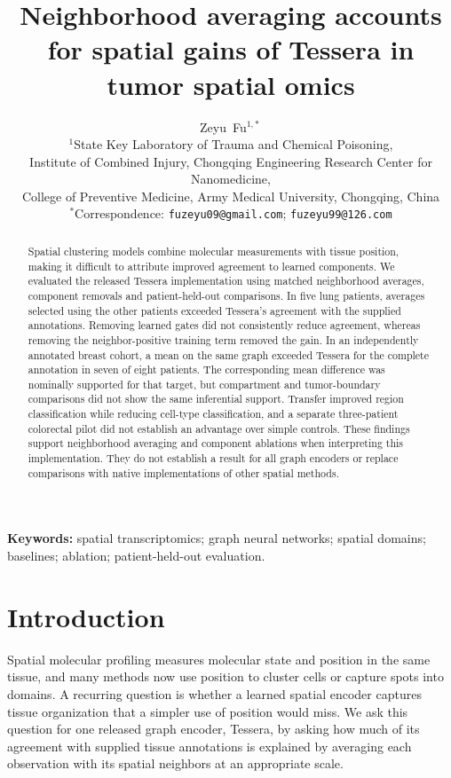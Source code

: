 \documentclass[11pt]{article}
\title{Neighborhood averaging accounts for spatial gains of Tessera in tumor spatial omics}
\author{Zeyu~Fu$^{1,*}$\,\orcidlink{0009-0001-8329-0108}\\[3pt]
\small $^1$State Key Laboratory of Trauma and Chemical Poisoning,\\
\small Institute of Combined Injury, Chongqing Engineering Research Center for Nanomedicine,\\
\small College of Preventive Medicine, Army Medical University, Chongqing, China\\
\small $^*$Correspondence: \texttt{fuzeyu09@gmail.com}; \texttt{fuzeyu99@126.com}}
\date{}
\begin{document}
\raggedbottom\maketitle
\modulolinenumbers[5]\linenumbers
\begin{abstract}
Spatial clustering models combine molecular measurements with tissue position, making it difficult to attribute improved agreement to learned components. We evaluated the released Tessera implementation using matched neighborhood averages, component removals and patient-held-out comparisons. In five lung patients, averages selected using the other patients exceeded Tessera's agreement with the supplied annotations. Removing learned gates did not consistently reduce agreement, whereas removing the neighbor-positive training term removed the gain. In an independently annotated breast cohort, a mean on the same graph exceeded Tessera for the complete annotation in seven of eight patients. The corresponding mean difference was nominally supported for that target, but compartment and tumor-boundary comparisons did not show the same inferential support. Transfer improved region classification while reducing cell-type classification, and a separate three-patient colorectal pilot did not establish an advantage over simple controls. These findings support neighborhood averaging and component ablations when interpreting this implementation. They do not establish a result for all graph encoders or replace comparisons with native implementations of other spatial methods.
\end{abstract}
\noindent\textbf{Keywords:} spatial transcriptomics; graph neural networks; spatial domains; baselines; ablation; patient-held-out evaluation.

\section{Introduction}
Spatial molecular profiling measures molecular state and position in the same tissue, and many methods now use position to cluster cells or capture spots into domains. A recurring question is whether a learned spatial encoder captures tissue organization that a simpler use of position would miss. We ask this question for one released graph encoder, Tessera, by asking how much of its agreement with supplied tissue annotations is explained by averaging each observation with its spatial neighbors at an appropriate scale.
\end{document}
